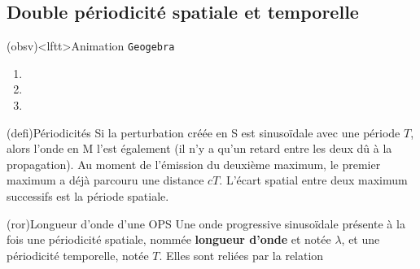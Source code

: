 \documentclass[../../main/main.tex]{subfiles}
\begin{document}

\subsection{Double périodicité spatiale et temporelle}
\begin{tcb}(obsv)<lftt>{Animation \texttt{Geogebra}}
	\begin{enumerate}
		\item {}
		\item {}
		\item {}
	\end{enumerate}
\end{tcb}

\begin{tcb*}[sidebyside, sidebyside align=top](defi){Périodicités}
	Si la perturbation créée en S est sinusoïdale avec une période $T$, alors
	l'onde en M l'est également (il n'y a qu'un retard entre les deux dû à la
	propagation).
	\tcblower
	Au moment de l'émission du deuxième maximum, le premier maximum a déjà
	parcouru une distance $cT$. L'écart spatial entre deux maximum successifs est
	la période spatiale.
\end{tcb*}

\begin{tcb}(ror){Longueur d'onde d'une OPS}
	Une onde progressive sinusoïdale présente à la fois une périodicité spatiale,
	nommée \textbf{longueur d'onde} et notée $\lambda$, et une périodicité
	temporelle, notée $T$. Elles sont reliées par la relation
	\psw{%
		\[\boxed{\lambda = cT = \frac{c}{f}}\]
	}
	\vspace{-15pt}
\end{tcb}
\end{document}
